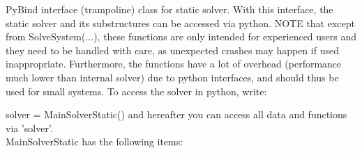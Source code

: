  \label{sec_MainSolverStatic}
PyBind interface (trampoline) class for static solver. With this interface, the static solver and its substructures can be accessed via python. NOTE that except from SolveSystem(...), these functions are only intended for experienced users and they need to be handled with care, as unexpected crashes may happen if used inappropriate. Furthermore, the functions have a lot of overhead (performance much lower than internal solver) due to python interfaces, and should thus be used for small systems. To access the solver in python, write: \bi
 \item[] solver = MainSolverStatic() 
\ei
 and hereafter you can access all data and functions via 'solver'.\\ 
%
MainSolverStatic has the following items:
